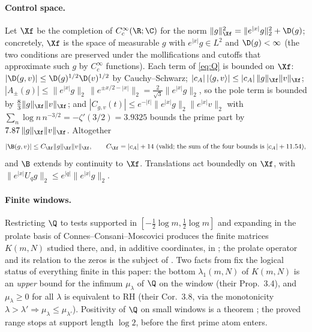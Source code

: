 \paragraph{Control space.} Let $\Xf$ be the completion of $C_c^\infty(\R;\C)$ for the norm
$\|g\|_{\Xf}^2=\|e^{|x|}g\|_2^2+\D(g)$; concretely, $\Xf$ is the space of measurable $g$ with $e^{|x|}g\in L^2$ and $\D(g)<\infty$
(the two conditions are preserved under the mollifications and cutoffs that approximate such $g$ by $C_c^\infty$ functions). Each term
of \eqref{eq:Q} is bounded on $\Xf$: $|\D(g,v)|\le\D(g)^{1/2}\D(v)^{1/2}$ by Cauchy--Schwarz; $|c_A|\,|\langle g,v\rangle|\le|c_A|\,\|g\|_{\Xf}\|v\|_{\Xf}$;
$|A_\pm(g)|\le\|e^{|x|}g\|_2\,\|e^{\pm x/2-|x|}\|_2=\tfrac2{\sqrt3}\|e^{|x|}g\|_2$, so the pole term is bounded by $\tfrac83\|g\|_{\Xf}\|v\|_{\Xf}$;
and $|C_{g,v}(t)|\le e^{-|t|}\|e^{|x|}g\|_2\|e^{|x|}v\|_2$ with $\sum_n\log n\,n^{-3/2}=-\zeta'(3/2)=3.9325$ bounds the prime part by
$7.87\,\|g\|_{\Xf}\|v\|_{\Xf}$. Altogether
\[
 |\B(g,v)|\le C_{\Xf}\|g\|_{\Xf}\|v\|_{\Xf},\qquad C_{\Xf}=|c_A|+14\ (\text{valid; the sum of the four bounds is }|c_A|+11.54),
\]
and $\B$ extends by continuity to $\Xf$. Translations act boundedly on $\Xf$, with $\|e^{|x|}U_qg\|_2\le e^{|q|}\|e^{|x|}g\|_2$.

\paragraph{Finite windows.} Restricting $\Q$ to tests supported in $[-\tfrac12\log m,\tfrac12\log m]$ and expanding in
the prolate basis of Connes--Consani--Moscovici \cite{CCM-ZST-2025} produces the finite matrices $K(m,N)$ studied there,
and, in additive coordinates, in \cite{XUEFENGZHU-2026}; the prolate operator and its relation to the zeros is the
subject of \cite{ConnesMoscovici2021}. Two facts from \cite{CCM-ZST-2025} fix the logical status of
everything finite in this paper: the bottom $\lambda_1(m,N)$ of $K(m,N)$ is an \emph{upper} bound for the infimum
$\mu_\lambda$ of $\Q$ on the window (their Prop.~3.4), and $\mu_\lambda\ge0$ for all $\lambda$ is equivalent to RH
(their Cor.~3.8, via the monotonicity $\lambda>\lambda'\Rightarrow\mu_\lambda\le\mu_{\lambda'}$). Positivity of $\Q$ on
small windows is a theorem \cite{YOSHIDA-HERMITIAN-1992,BOMBIERI-WEILQF-2000,CC-WEILPOS-2020}; the proved range stops at
support length $\log 2$, before the first prime atom enters.
